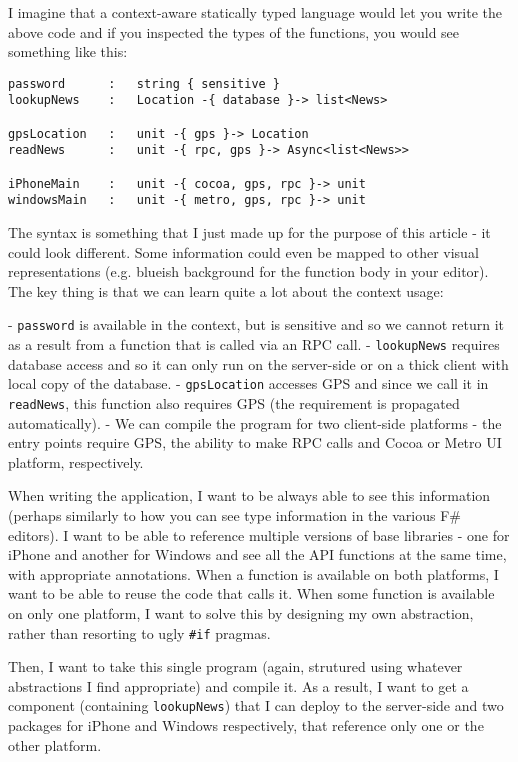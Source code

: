 I imagine that a context-aware statically typed language would let you write the above code and 
if you inspected the types of the functions, you would see something like this:

\begin{verbatim}
password      :   string { sensitive }
lookupNews    :   Location -{ database }-> list<News> 

gpsLocation   :   unit -{ gps }-> Location 
readNews      :   unit -{ rpc, gps }-> Async<list<News>> 

iPhoneMain    :   unit -{ cocoa, gps, rpc }-> unit 
windowsMain   :   unit -{ metro, gps, rpc }-> unit 
\end{verbatim}

The syntax is something that I just made up for the purpose of this article - it could
look different. Some information could even be mapped to other visual representations
(e.g. blueish background for the function body in your editor). The key thing is that
we can learn quite a lot about the context usage:

 - \texttt{password} is available in the context, but is sensitive and so we cannot return it
   as a result from a function that is called via an RPC call.
 - \texttt{lookupNews} requires database access and so it can only run on the server-side
   or on a thick client with local copy of the database.
 - \texttt{gpsLocation} accesses GPS and since we call it in \texttt{readNews}, this function
   also requires GPS (the requirement is propagated automatically).
 - We can compile the program for two client-side platforms - the entry points require
   GPS, the ability to make RPC calls and Cocoa or Metro UI platform, respectively.

When writing the application, I want to be always able to see this information (perhaps
similarly to how you can see type information in the various F\# editors). I want to be
able to reference multiple versions of base libraries - one for iPhone and another for
Windows and see all the API functions at the same time, with appropriate annotations.
When a function is available on both platforms, I want to be able to reuse the code that
calls it. When some function is available on only one platform, I want to solve this by
designing my own abstraction, rather than resorting to ugly \texttt{\#if} pragmas.

Then, I want to take this single program (again, strutured using whatever abstractions
I find appropriate) and compile it. As a result, I want to get a component (containing
\texttt{lookupNews}) that I can deploy to the server-side and two packages for iPhone and 
Windows respectively, that reference only one or the other platform.

